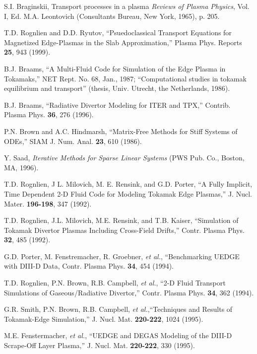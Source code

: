 \documentclass [12pt]{article}
\begin{document}
\begin{thebibliography}{99}
  
 S.I. Braginskii, Transport processes in a plasma {\it Reviews
    of Plasma Physics}, Vol. I, Ed. M.A. Leontovich (Consultants Bureau, New
  York, 1965), p. 205.
  
 T.D. Rognlien and D.D. Ryutov, ``Psuedoclassical Transport
Equations for Magnetized Edge-Plasmas in the Slab Approximation,'' Plasma
Phys. Reports {\bf 25}, 943 (1999).

 B.J. Braams, ``A Multi-Fluid Code for Simulation of the
  Edge Plasma in Tokamaks,'' NET Rept. No. 68, Jan., 1987; ``Computational
  studies in tokamak equilibrium and transport'' (thesis, Univ. Utrecht, the
  Netherlands, 1986).
 
 B.J. Braams, ``Radiative Divertor Modeling for ITER and
  TPX,'' Contrib. Plasma Phys. {\bf 36}, 276 (1996).
  
 P.N. Brown and A.C. Hindmarsh, ``Matrix-Free Methods for
Stiff Systems of ODEs,'' SIAM J. Num. Anal. {\bf 23}, 610 (1986).

 Y. Saad, {\it Iterative Methods for Sparse Linear Systems}
  (PWS Pub. Co., Boston, MA, 1996).

 T.D. Rognlien, J L. Milovich, M. E. Rensink, and G.D. Porter,
  ``A Fully Implicit, Time Dependent 2-D Fluid Code for Modeling Tokamak Edge
  Plasmas,'' J. Nucl. Mater. {\bf 196-198}, 347 (1992).
  
 T.D. Rognlien, J.L. Milovich, M.E. Rensink, and T.B.  Kaiser,
  ``Simulation of Tokamak Divertor Plasmas Including Cross-Field Drifts,''
  Contr. Plasma Phys. {\bf 32}, 485 (1992).

 G.D. Porter, M. Fenstremacher, R. Groebner, {\it et al.},
  ``Benchmarking UEDGE with DIII-D Data, Contr. Plasma Phys. {\bf 34}, 454
  (1994).
  
 T.D. Rognlien, P.N. Brown, R.B. Campbell, {\it et al.}, ``2-D
  Fluid Transport Simulations of Gaseous/Radiative Divertor,'' Contr. Plasma
  Phys.  {\bf 34}, 362 (1994).
  
 G.R. Smith, P.N. Brown, R.B. Campbell, {\it et al.},``Techniques
  and Results of Tokamak-Edge Simulation,'' J. Nucl. Mat. {\bf 220-222}, 1024
  (1995).
  
 M.E. Fenstermacher, {\it et al.}, ``UEDGE and DEGAS Modeling of
  the DIII-D Scrape-Off Layer Plasma,'' J. Nucl. Mat. {\bf 220-222}, 330
  (1995).
  

\end{thebibliography}
\end{document}
